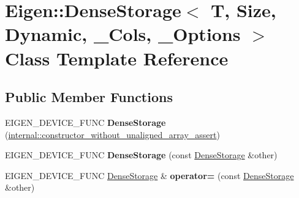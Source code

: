 \hypertarget{class_eigen_1_1_dense_storage_3_01_t_00_01_size_00_01_dynamic_00_01___cols_00_01___options_01_4}{}\section{Eigen\+::Dense\+Storage$<$ T, Size, Dynamic, \+\_\+\+Cols, \+\_\+\+Options $>$ Class Template Reference}
\label{class_eigen_1_1_dense_storage_3_01_t_00_01_size_00_01_dynamic_00_01___cols_00_01___options_01_4}
\subsection*{Public Member Functions}
\begin{DoxyCompactItemize}
\item 
\mbox{\label{class_eigen_1_1_dense_storage_3_01_t_00_01_size_00_01_dynamic_00_01___cols_00_01___options_01_4_a3ab59c2d4d00d134e177f5f6ac2f3240}} 
E\+I\+G\+E\+N\+\_\+\+D\+E\+V\+I\+C\+E\+\_\+\+F\+U\+NC {\bfseries Dense\+Storage} (\mbox{\hyperlink{struct_eigen_1_1internal_1_1constructor__without__unaligned__array__assert}{internal\+::constructor\+\_\+without\+\_\+unaligned\+\_\+array\+\_\+assert}})
\item 
\mbox{\label{class_eigen_1_1_dense_storage_3_01_t_00_01_size_00_01_dynamic_00_01___cols_00_01___options_01_4_a26fbde591528002a057baf1278f8056d}} 
E\+I\+G\+E\+N\+\_\+\+D\+E\+V\+I\+C\+E\+\_\+\+F\+U\+NC {\bfseries Dense\+Storage} (const \mbox{\hyperlink{class_eigen_1_1_dense_storage}{Dense\+Storage}} \&other)
\item 
\mbox{\label{class_eigen_1_1_dense_storage_3_01_t_00_01_size_00_01_dynamic_00_01___cols_00_01___options_01_4_ab60f99a602f18548d68403c6dc294e02}} 
E\+I\+G\+E\+N\+\_\+\+D\+E\+V\+I\+C\+E\+\_\+\+F\+U\+NC \mbox{\hyperlink{class_eigen_1_1_dense_storage}{Dense\+Storage}} \& {\bfseries operator=} (const \mbox{\hyperlink{class_eigen_1_1_dense_storage}{Dense\+Storage}} \&other)
\item 
\mbox{\label{class_eigen_1_1_dense_storage_3_01_t_00_01_size_00_01_dynamic_00_01___cols_00_01___options_01_4_a7f0de5d9afca92c957a86fd170f3a1b2}} 

\end{DoxyCompactItemize}
